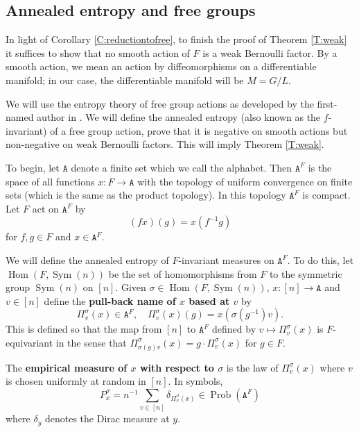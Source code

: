 \documentclass[11pt]{amsart}
\theoremstyle{definition}
\theoremstyle{remark}
\newcommand{\s}{\sigma}
\newcommand{\Hom}{\operatorname{Hom}}
\newcommand{\Sym}{\operatorname{Sym}}
\newcommand{\Prob}{\operatorname{Prob}}
\begin{document}
\subsection{Annealed entropy and free groups} \label{sec:annealed-entropy}


In light of Corollary \ref{C:reductiontofree}, to finish the proof of Theorem \ref{T:weak} it suffices to show that no smooth action of $F$ is a weak Bernoulli factor. By a smooth action, we mean an action by diffeomorphisms on a differentiable manifold; in our case, the differentiable manifold will be $M = G/L$.


We will use the entropy theory of free group actions as developed by the first-named author in \cite{MR2630067, MR2653969}. We will define the annealed entropy (also known as the $f$-invariant) of a free group action, prove that it is negative on smooth actions 
but non-negative on weak Bernoulli factors. This will imply Theorem \ref{T:weak}.

To begin, let $\mathtt{A}$ denote a finite set which we call the alphabet. Then $\mathtt{A}^F$ is the space of all functions $x:F \to \mathtt{A}$ with the topology of uniform convergence on finite sets (which is the same as the product topology). In this topology $\mathtt{A}^F$ is compact. Let $F$ act on $\mathtt{A}^F$ by
$$(fx)(g)=x(f^{-1}g)$$
for $f,g \in F$ and $x\in \mathtt{A}^F$.




We will define the annealed entropy of $F$-invariant measures on $\mathtt{A}^F$. To do this, let $\Hom(F,\Sym(n))$ be the set of homomorphisms from $F$ to the symmetric group $\Sym(n)$ on $[n]$. Given $\s \in \Hom(F,\Sym(n))$, $x:[n] \to \mathtt{A}$ and $v\in [n]$ define the \textbf{pull-back name of $x$ based at $v$} by
$$\Pi^\s_v(x) \in \mathtt{A}^F, \quad \Pi^\s_v(x)(g) = x(\s(g^{-1})v).$$
This is defined so that the map from $[n]$ to $\mathtt{A}^F$ defined by $v \mapsto \Pi^\s_v(x)$ is $F$-equivariant in the sense that $\Pi^\s_{\s(g)v}(x) = g\cdot \Pi^\s_v(x)$ for $g\in F$.

The \textbf{empirical measure of $x$ with respect to $\s$} is the law of $\Pi^\s_v(x)$ where $v$ is chosen uniformly at random in $[n]$. In symbols,
$$P^\s_x = n^{-1} \sum_{v \in [n]} \delta_{\Pi^\s_v(x)} \in \Prob(\mathtt{A}^F)$$
where $\delta_y$ denotes the Dirac measure at $y$.
\end{document}
